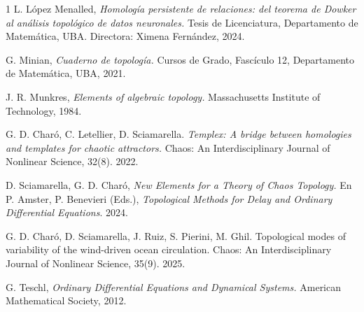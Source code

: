 \documentclass[12pt,a4paper]{article}
\begin{document}
\begin{thebibliography}{1}
L. López Menalled,
\textit{Homología persistente de relaciones: del teorema de Dowker al análisis topológico de datos neuronales.} Tesis de Licenciatura, Departamento de Matemática, UBA. Directora: Ximena Fernández, 2024.

G. Minian,
\textit{Cuaderno de topología.} Cursos de Grado, Fascículo 12, Departamento de Matemática, UBA, 2021.

J. R. Munkres,
\textit{Elements of algebraic topology.} Massachusetts Institute of Technology, 1984.

G. D. Charó, C. Letellier, D. Sciamarella. \textit{Templex: A bridge between homologies and templates for chaotic attractors.} Chaos: An Interdisciplinary Journal of Nonlinear Science, 32(8). 2022.

D. Sciamarella, G. D. Charó,
\textit{New Elements for a Theory of Chaos Topology.} En P. Amster, P. Benevieri (Eds.), \textit{Topological Methods for Delay and Ordinary Differential Equations}. 2024.

G. D. Charó, D. Sciamarella, J. Ruiz, S. Pierini, M. Ghil. Topological modes of variability of the wind-driven ocean circulation. Chaos: An Interdisciplinary Journal of Nonlinear Science, 35(9). 2025.

G. Teschl,
\textit{Ordinary Differential Equations and Dynamical Systems.} American Mathematical Society, 2012.
\end{thebibliography}
\end{document}
